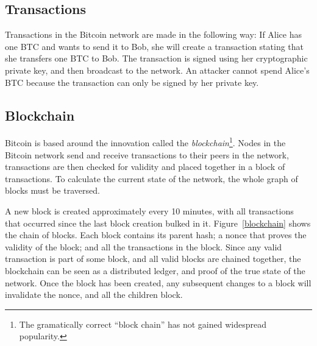 \subsection{Transactions}
Transactions in the Bitcoin network are made in the following way: If Alice has one BTC and wants to send it to Bob, she will create a transaction stating that she transfers one BTC to Bob. The transaction is signed using her cryptographic private key, and then broadcast to the network. An attacker cannot spend Alice's BTC because the transaction can only be signed by her private key.

\subsection{Blockchain}
Bitcoin is based around the innovation called the \emph{blockchain}\footnote{The gramatically correct ``block chain'' has not gained widespread popularity.}. Nodes in the Bitcoin network send and receive transactions to their peers in the network, transactions are then checked for validity and placed together in a block of transactions. To calculate the current state of the network, the whole graph of blocks must be traversed.

A new block is created approximately every 10 minutes, with all transactions that occurred since the last block creation bulked in it. Figure~\ref{blockchain} shows the chain of blocks. Each block contains its parent hash; a nonce that proves the validity of the block; and all the transactions in the block. Since any valid transaction is part of some block, and all valid blocks are chained together, the blockchain can be seen as a distributed ledger, and proof of the true state of the network. Once the block has been created, any subsequent changes to a block will invalidate the nonce, and all the children block.

